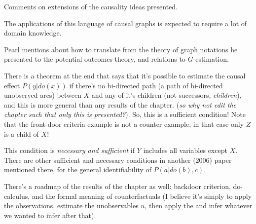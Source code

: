 Comments on extensions of the causality ideas presented.

The applications of this language of causal graphs is expected to require a lot of domain knowledge.

Pearl mentions about how to translate from the theory of graph notations he presented to the potential outcomes theory, and relations to $G$-estimation.

There is a theorem at the end that says that it's possible to estimate the causal effect $P(y|do(x))$ if there's no bi-directed path (a path of bi-directed unobserved arcs) between $X$ and any of it's children (not successors, \textit{children}), and this is more general than any results of the chapter. (\textit{so why not edit the chapter such that only this is presented?}). So, this is a sufficient condition! Note that the front-door criteria example is not a counter example, in that case only $Z$ is a child of $X$!

This condition is \textit{necessary and sufficient} if $Y$ includes all variables except $X$. There are other sufficient and necessary conditions in another (2006) paper mentioned there, for the general identifiability of $P(a|do(b),c)$.

There's a roadmap of the results of the chapter as well: backdoor criterion, do-calculus, and the formal meaning of counterfactuals (I believe it's simply to apply the observations, estimate the unobservables $u$, then apply the  and infer whatever we wanted to infer after that).
